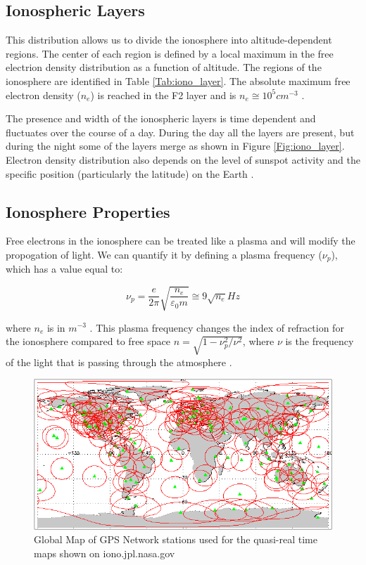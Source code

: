 \subsection{Ionospheric Layers}
This distribution allows us to divide the ionosphere into altitude-dependent regions. The center of each region is defined by a local maximum in the free electrion density distribution as a function of altitude. The regions of the ionosphere are identified in Table \ref{Tab:iono_layer}.  The absolute maximum free electron density ($n_e$) is reached in the F2 layer and is $n_e \cong 10^5 cm^{-3}$ \cite{ionospheres}. 

The presence and width of the ionospheric layers is time dependent and fluctuates over the course of a day. During the day all the layers are present, but during the night some of the layers merge as shown in Figure \ref{Fig:iono_layer}. Electron density distribution also depends on the level of sunspot activity and the specific position (particularly the latitude) on the Earth \cite{thompson_2001}. 

\subsection{Ionosphere Properties}
Free electrons in the ionosphere can be treated like a plasma and will modify the propogation of light. We can quantify it by defining a plasma frequency ($\nu_p$), which has a value equal to:

\begin{equation}
\nu_p = \frac{e}{2 \pi} \sqrt{\frac{n_e}{\varepsilon_0 m}} \cong 9 \sqrt{n_e} Hz
\end{equation}

where $n_e$ is in $m^{-3}$ \cite{thompson_2001}. This plasma frequency changes the index of refraction for the ionosphere compared to free space $n = \sqrt{1-\nu_p^2/\nu^2}$, where $\nu$ is the frequency of the light that is passing through the atmosphere \cite{thompson_2001}. 

\begin{figure}[htb]
\begin{center}
\includegraphics[width=0.95\linewidth]{Ionosphere/figures/gps_sitemap.png}
\caption{Global Map of GPS Network stations used for the quasi-real time maps shown on iono.jpl.nasa.gov}
\label{Fig:gps_stat}
\end{center}
\end{figure}

